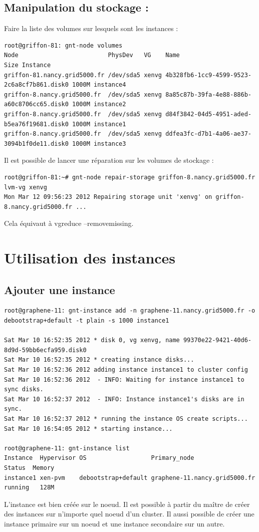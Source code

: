 \subsection {Manipulation du stockage :}

Faire la liste des volumes sur lesquels sont les instances : 
\begin{lstlisting}
root@griffon-81: gnt-node volumes
Node                         PhysDev   VG    Name                                        Size Instance 
griffon-81.nancy.grid5000.fr /dev/sda5 xenvg 4b328fb6-1cc9-4599-9523-2c6a8cf7b861.disk0 1000M instance4
griffon-8.nancy.grid5000.fr  /dev/sda5 xenvg 8a85c87b-39fa-4e88-886b-a60c8706cc65.disk0 1000M instance2
griffon-8.nancy.grid5000.fr  /dev/sda5 xenvg d84f3842-04d5-4951-aded-b5ea76f19681.disk0 1000M instance1
griffon-8.nancy.grid5000.fr  /dev/sda5 xenvg ddfea3fc-d7b1-4a06-ae37-3094b1f0de11.disk0 1000M instance3
\end{lstlisting}
Il est possible de lancer une réparation sur les volumes de stockage :
\begin{lstlisting}
root@griffon-81:~# gnt-node repair-storage griffon-8.nancy.grid5000.fr lvm-vg xenvg
Mon Mar 12 09:56:23 2012 Repairing storage unit 'xenvg' on griffon-8.nancy.grid5000.fr ...
\end{lstlisting}
Cela équivaut à vgreduce --removemissing.



\section {Utilisation des instances}

\subsection {Ajouter une instance}
\begin{lstlisting}
root@graphene-11: gnt-instance add -n graphene-11.nancy.grid5000.fr -o debootstrap+default -t plain -s 1000 instance1

Sat Mar 10 16:52:35 2012 * disk 0, vg xenvg, name 99370e22-9421-40d6-8d9d-59bb6ecfa959.disk0
Sat Mar 10 16:52:35 2012 * creating instance disks...
Sat Mar 10 16:52:36 2012 adding instance instance1 to cluster config
Sat Mar 10 16:52:36 2012  - INFO: Waiting for instance instance1 to sync disks.
Sat Mar 10 16:52:37 2012  - INFO: Instance instance1's disks are in sync.
Sat Mar 10 16:52:37 2012 * running the instance OS create scripts...
Sat Mar 10 16:54:05 2012 * starting instance...

root@graphene-11: gnt-instance list
Instance  Hypervisor OS                  Primary_node                  Status  Memory
instance1 xen-pvm    debootstrap+default graphene-11.nancy.grid5000.fr running   128M
\end{lstlisting}
L'instance est bien créée sur le noeud. Il est possible à partir du maître de créer des instances sur n'importe quel noeud d'un cluster. Il aussi possible de créer une instance primaire sur un noeud et une instance secondaire sur un autre.

